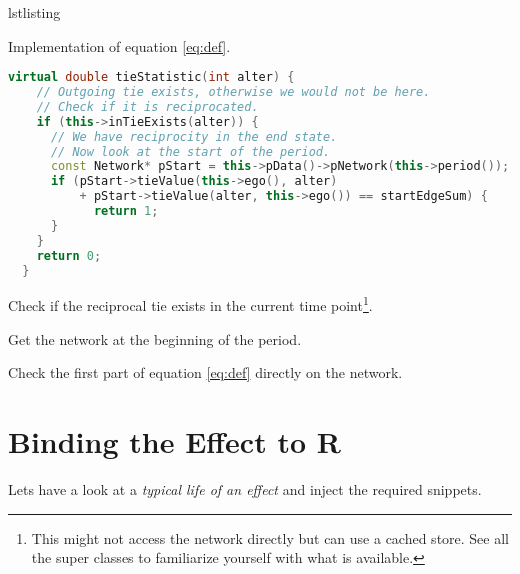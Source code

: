 \documentclass{tufte-handout}
\makeatletter
\newenvironment{listing}[1][htbp]
  {\ifvmode\else\unskip\fi\begin{@tufte@float}[#1]{lstlisting}{}}
  {\end{@tufte@float}}
\def\linestyle{\color{white!50!black}}
\makeatother
\begin{document}
\begin{listing}
\caption{
  Implementation of equation \ref{eq:def}.
}
\begin{lstlisting}[language=c++]
  virtual double tieStatistic(int alter) {
    // Outgoing tie exists, otherwise we would not be here.
    // Check if it is reciprocated.
    if (this->inTieExists(alter)) {
      // We have reciprocity in the end state.
      // Now look at the start of the period.
      const Network* pStart = this->pData()->pNetwork(this->period());
      if (pStart->tieValue(this->ego(), alter)
          + pStart->tieValue(alter, this->ego()) == startEdgeSum) {
            return 1;
      }
    }
    return 0;
  }
\end{lstlisting}
\end{listing}
\begin{description}\itemsep0pt
  \item[\linestyle line 4] Check if the reciprocal tie exists in the current time point\footnote{
      This might not access the network directly but can use a cached store.
      See all the super classes to familiarize yourself with what is available.
    }.
  \item[\linestyle line 7] Get the network at the beginning of the period.
  \item[\linestyle line 8-11] Check the first part of equation \ref{eq:def} directly on the network.
\end{description}

\section{Binding the Effect to R}

Lets have a look at a \emph{typical life of an effect} and inject the required snippets.
\end{document}
